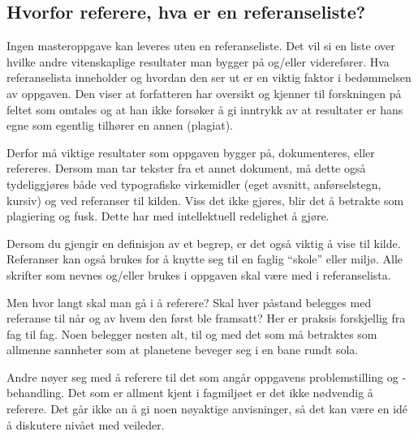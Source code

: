 \documentclass[11pt,norsk,a4paper]{article}
\newcommand{\bt}{BibTeX{}}
\begin{document}



\subsection*{Hvorfor referere, hva er en referanseliste?}
Ingen masteroppgave kan leveres uten en referanseliste. Det vil si en
liste over hvilke andre vitenskaplige resultater man bygger på
og/eller viderefører. Hva referanselista inneholder 
og hvordan den ser ut er en viktig faktor i bedømmelsen
av oppgaven. Den viser at forfatteren har oversikt og kjenner til
forskningen på feltet som omtales og at han ikke forsøker å gi
inntrykk av at resultater er hans egne som egentlig tilhører en annen
(plagiat).

Derfor må viktige resultater som oppgaven bygger på, dokumenteres,
eller refereres. Dersom man tar tekster fra et annet dokument, må
dette også tydeliggjøres både ved typografiske virkemidler (eget
avsnitt, anførselstegn, kursiv) og ved referanser til kilden. Viss det
ikke gjøres, blir det å betrakte som plagiering og fusk. Dette har med
intellektuell redelighet å gjøre.

Dersom du gjengir en definisjon av et begrep, er det også viktig å
vise til kilde. Referanser kan også brukes for å knytte seg til en
faglig ``skole'' eller miljø. Alle skrifter som nevnes og/eller brukes
i oppgaven skal være med i referanselista.

Men hvor langt skal man gå i å referere? Skal hver påstand belegges med
referanse til når og av hvem den først ble framsatt? Her er praksis
forskjellig fra fag til fag. Noen belegger nesten alt, til og med det
som må betraktes som allmenne sannheter som at planetene beveger seg i
en bane rundt sola\cite{copernicus}.

Andre nøyer seg med å referere til det som angår oppgavens
problemstilling og -behandling. Det som er allment kjent i fagmiljøet
er det ikke nødvendig å referere. Det går ikke an å gi noen nøyaktige
anvisninger, så det kan være en idé å diskutere nivået med veileder.
\end{document}
